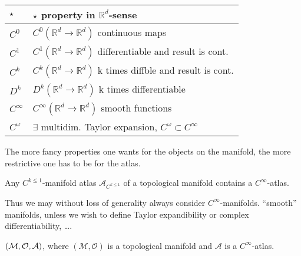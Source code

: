 \documentclass[11pt, a4paper, twocolumn]{article} %
\begin{document}
\begin{tabular}{ll}
    $\star$ & $\star$ property in $\mathbb{R}^d$-sense \\
    \hline\hline
    $C^0$     & $C^0(\mathbb{R}^d \to \mathbb{R}^d)$ continuous maps\\
    $C^1$     & $C^1(\mathbb{R}^d \to \mathbb{R}^d)$ differentiable and result is cont.\\
    $C^k$     & $C^k(\mathbb{R}^d \to \mathbb{R}^d)$ k times diffble and result is cont.\\
    $D^k$     & $D^k(\mathbb{R}^d \to \mathbb{R}^d)$ k times differentiable\\
    $C^\infty$     & $C^\infty(\mathbb{R}^d \to \mathbb{R}^d)$ smooth functions\\
    $C^\omega$  & $\exists$ multidim. Taylor expansion, $C^\omega \subset C^\infty$
\end{tabular}
\begin{note}
    The more fancy properties one wants for the objects on the manifold, the more restrictive one
    has to be for the atlas.
\end{note}
\begin{theorem}[$C^1\to C^\infty$]
    Any $C^{k \leq 1}$-manifold atlas $\mathcal{A}_{C^{k\leq 1}}$ of a topological manifold contains
    a $C^\infty$-atlas.
\end{theorem}
Thus we may without loss of generality always consider $C^\infty$-manifolds. 
``smooth'' manifolds, unless we wish to define Taylor expandibility or complex differentiability, \ldots.
\begin{defn}
    $(\mathcal{M}, \mathcal{O}, \mathcal{A})$, where $(\mathcal{M, O})$ is a topological manifold and $\mathcal{A}$ is a $C^\infty$-atlas.
\end{defn}
\end{document}
